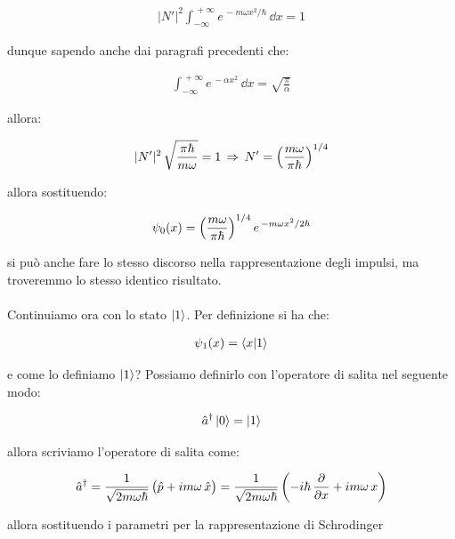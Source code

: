 \begin{align*}
	|N'|^2 \int_{-\infty}^{\, + \infty} e^{\, - m\omega x^2/\hbar} \, \dd x = 1
\end{align*}

	dunque sapendo anche dai paragrafi precedenti che:
	
\begin{align*}
	\int_{-\infty}^{\, + \infty} e^{\, - \alpha x^2} \, \dd x = \sqrt{\frac{\pi}{\alpha}}
\end{align*}

	allora:
	
\begin{align*}
	|N'|^2 \, \sqrt{\frac{\pi \hbar}{m\omega}} = 1 \, \Rightarrow \, N' = \qty(\frac{m\omega}{\pi \hbar})^{1/4}
\end{align*}

	allora sostituendo:

\begin{nb}
\begin{align*}
	\psi_0(x) = \qty(\frac{m\omega}{\pi \hbar})^{1/4} \, e^{\, - m\omega x^2/2\hbar}
\end{align*}
\end{nb}

	si può anche fare lo stesso discorso nella rappresentazione degli impulsi, ma troveremmo lo stesso identico risultato.
	\\
	\\
	Continuiamo ora con lo stato $\ket{1}$. Per definizione si ha che:
	
\begin{align*}
	\psi_1(x) = \braket{x}{1}
\end{align*}

	e come lo definiamo $\ket{1}$? Possiamo definirlo con l'operatore di salita nel seguente modo:
	
\begin{align*}
	\hat{a}^{\dagger} \ket{0} = \ket{1}
\end{align*}

	allora scriviamo l'operatore di salita come:
	
\begin{align*}
	\hat{a}^{\dagger} = \frac{1}{\sqrt{2m\omega \hbar}} \, \qty\big(\hat{p} + im\omega \, \hat{x}) = \frac{1}{\sqrt{2m\omega \hbar}} \, \qty(- i \hbar \, \pdv{x} + im\omega \, x) 
\end{align*}

	allora sostituendo i parametri per la rappresentazione di Schrodinger 
	
